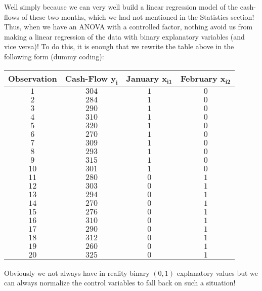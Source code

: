 	Well simply because we can very well build a linear regression model of the cash-flows of these two months, which we had not mentioned in the Statistics section! Thus, when we have an ANOVA with a controlled factor, nothing avoid us from making a linear regression of the data with binary explanatory variables (and vice versa)! To do this, it is enough that we rewrite the table above in the following form (dummy coding):
	\begin{table}[H]
	\centering
			\begin{tabular}{|c|c|c|c|}
				\hline
				\cellcolor{black!30}\textbf{Observation} & \cellcolor{black!30}\textbf{Cash-Flow $\pmb{y_i}$} & \cellcolor{black!30}\textbf{January $\pmb{x_{i1}}$} & \cellcolor{black!30}\textbf{February $\pmb{x_{i2}}$} \\ \hline
				$1$ & $304$ & $1$ & $0$ \\ \hline
				$2$ & $284$ & $1$ & $0$ \\ \hline
				$3$ & $290$ & $1$ & $0$ \\ \hline
				$4$ & $310$ & $1$ & $0$ \\ \hline
				$5$ & $320$ & $1$ & $0$ \\ \hline
				$6$ & $270$ & $1$ & $0$ \\ \hline
				$7$ & $309$ & $1$ & $0$ \\ \hline
				$8$ & $293$ & $1$ & $0$ \\ \hline
				$9$ & $315$ & $1$ & $0$ \\ \hline
				$10$ & $301$ & $1$ & $0$ \\ \hline
				$11$ & $280$ & $0$ & $1$ \\ \hline
				$12$ & $303$ & $0$ & $1$ \\ \hline
				$13$ & $294$ & $0$ & $1$ \\ \hline
				$14$ & $270$ & $0$ & $1$ \\ \hline
				$15$ & $276$ & $0$ & $1$ \\ \hline
				$16$ & $310$ & $0$ & $1$ \\ \hline
				$17$ & $290$ & $0$ & $1$ \\ \hline
				$18$ & $312$ & $0$ & $1$ \\ \hline
				$19$ & $260$ & $0$ & $1$ \\ \hline
				$20$ & $325$ & $0$ & $1$ \\ \hline
		\end{tabular}
	\end{table}
	Obviously we not always have in reality binary $(0,1)$ explanatory values but we can always normalize the control variables to fall back on such a situation!
	
